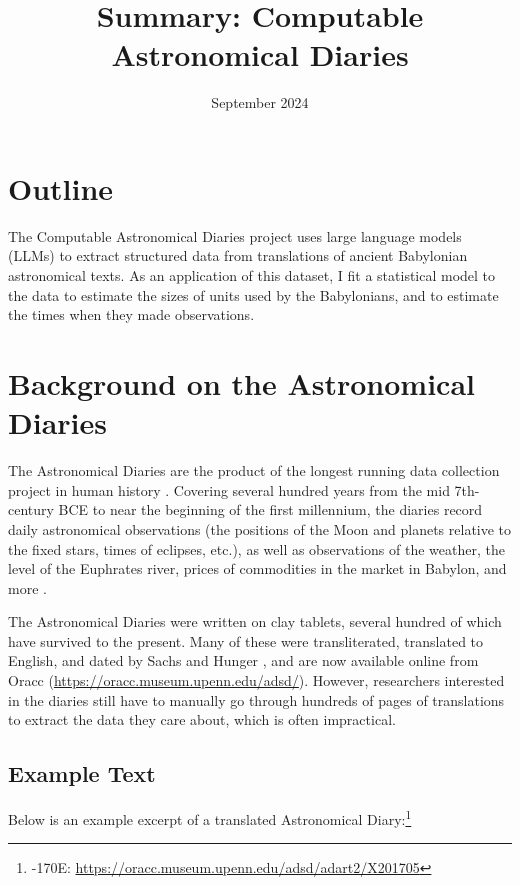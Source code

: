 \documentclass{article}
\title{Summary: Computable Astronomical Diaries}
\date{September 2024}
\begin{document}
\maketitle

\section{Outline}

The Computable Astronomical Diaries project uses large language models (LLMs) to extract structured data from translations of ancient Babylonian astronomical texts. As an application of this dataset, I fit a statistical model to the data to estimate the sizes of units used by the Babylonians, and to estimate the times when they made observations.

\section{Background on the Astronomical Diaries}
The Astronomical Diaries are the product of the longest running data collection project in human history \autocite[p.~41]{steeleIntro}\autocite{whoWrote}. Covering several hundred years from the mid 7th-century BCE to near the beginning of the first millennium, the diaries record daily astronomical observations (the positions of the Moon and planets relative to the fixed stars, times of eclipses, etc.), as well as observations of the weather, the level of the Euphrates river, prices of commodities in the market in Babylon, and more \autocite{sachsHunger}.

The Astronomical Diaries were written on clay tablets, several hundred of which have survived to the present. Many of these were transliterated, translated to English, and dated by Sachs and Hunger \autocite{sachsHunger}, and are now available online from Oracc (\url{https://oracc.museum.upenn.edu/adsd/}). However, researchers interested in the diaries still have to manually go through hundreds of pages of translations to extract the data they care about, which is often impractical.

\subsection{Example Text}
Below is an example excerpt of a translated Astronomical Diary:\footnote{-170E: \url{https://oracc.museum.upenn.edu/adsd/adart2/X201705}}
\end{document}
